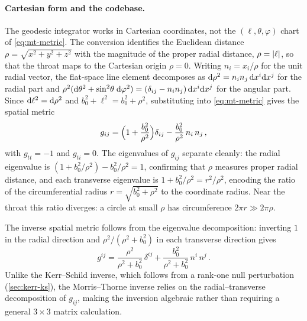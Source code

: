 \paragraph{Cartesian form and the codebase.}

The geodesic integrator works in Cartesian coordinates, not the
$(\ell, \theta, \varphi)$ chart of \cref{eq:mt-metric}.  The
conversion identifies the Euclidean distance
$\rho = \sqrt{x^2 + y^2 + z^2}$ with the magnitude of the proper
radial distance, $\rho = \left\lvert \ell \right\rvert$, so that the throat maps to
the Cartesian origin $\rho = 0$.  Writing $n_i = x_i/\rho$ for the
unit radial vector, the flat-space line element decomposes as
$\mathrm{d}\rho^2 = n_i n_j \,\mathrm{d} x^i \mathrm{d} x^j$ for the radial part and
$\rho^2(\mathrm{d}\theta^2 + \sin^2\!\theta\;\mathrm{d}\varphi^2) =
  (\delta_{ij} - n_i n_j)\,\mathrm{d} x^i \mathrm{d} x^j$
for the angular part.  Since $\mathrm{d}\ell^2 = \mathrm{d}\rho^2$ and
$b_0^2 + \ell^2 = b_0^2 + \rho^2$, substituting into
\cref{eq:mt-metric} gives the spatial metric
%
\begin{equation}
  g_{ij} = \Bigl(1 + \frac{b_0^2}{\rho^2}\Bigr)\delta_{ij}
           - \frac{b_0^2}{\rho^2}\,n_i\,n_j \,,
  \label{eq:mt-cartesian-spatial}
\end{equation}
%
with $g_{tt} = -1$ and $g_{ti} = 0$.  The eigenvalues of $g_{ij}$
separate cleanly: the radial eigenvalue is
$(1 + b_0^2/\rho^2) - b_0^2/\rho^2 = 1$, confirming that $\rho$
measures proper radial distance, and each transverse eigenvalue is
$1 + b_0^2/\rho^2 = r^2/\rho^2$, encoding the ratio of the
circumferential radius $r = \sqrt{b_0^2 + \rho^2}$ to the coordinate
radius.  Near the throat this ratio diverges: a circle at small
$\rho$ has circumference $2\pi r \gg 2\pi\rho$.

The inverse spatial metric follows from the eigenvalue decomposition:
inverting $1$ in the radial direction and $\rho^2/(\rho^2 + b_0^2)$
in each transverse direction gives
%
\begin{equation}
  g^{ij} = \frac{\rho^2}{\rho^2 + b_0^2}\,\delta^{ij}
           + \frac{b_0^2}{\rho^2 + b_0^2}\,n^i\,n^j \,.
  \label{eq:mt-cartesian-inverse}
\end{equation}
%
Unlike the Kerr--Schild inverse, which follows from a rank-one null
perturbation (\cref{sec:kerr-ks}), the Morris--Thorne inverse relies
on the radial--transverse decomposition of $g_{ij}$, making the
inversion algebraic rather than requiring a general $3\times 3$
matrix calculation.

